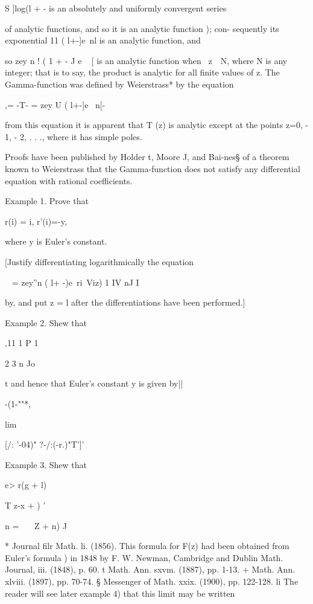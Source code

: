 %
%

S ]log(l + - is an absolutely and uniformly convergent series

of analytic functions, and so it is an analytic function );
con- sequently its exponential 11 ( l+-]e~nl is an analytic function,
and

so zey n ! ( 1 + - J e ~ [ is an analytic function when \ z\ \ N,
where N is any integer; that is to say, the product is analytic for
all finite values of z. The Gamma-function was defined by Weierstrass*
by the equation

,= -T- = zey U ( l+-]e ~n[-

from this equation it is apparent that T (z) is analytic except at the
points z=0, - 1, - 2, . . ., where it has simple poles.

Proofs have been published by Holder t, Moore J, and Bai-nes§ of a
theorem known to Weierstrass that the Gamma-function does not satisfy
any differential equation with rational coefficients.

Example 1. Prove that

r(i) = i, r'(i)=-y,

where y is Euler's constant.

[Justify differentiating logarithmically the equation

~ = zey''n ( l+ -)e~ri\ Viz) 1 IV nJ I

by, and put z = l after the differentiations have been
performed.]

Example 2. Shew that

,11 1 P 1

2 3 n Jo

t and hence that Euler's constant y is given by||

-(1-""*,

lim

[/: '-04)" ?-/:(-r.)"T']'

Example 3. Shew that

e> r(g + l)

T z-x + ) '

n = \ \ \ Z + n) J

* Journal filr Math. li. (1856). This formula for F(z) had been
obtained from Euler's formula ) in 1848 by F. W. Newman,
Cambridge and Dublin Math. Journal, iii. (1848), p. 60. t Math. Ann.
sxvm. (1887), pp. 1-13. + Math. Ann. xlviii. (1897), pp. 70-74. §
Messenger of Math. xxix. (1900), pp. 122-128. li The reader will see
later  example 4) that this limit may be written

